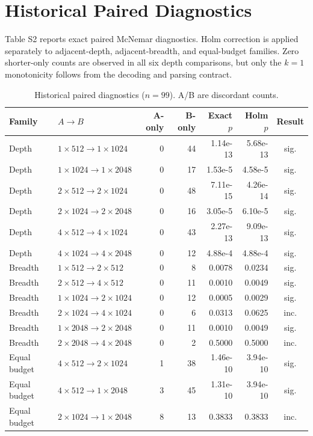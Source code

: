 \documentclass[runningheads]{llncs}
\begin{document}
\section{Historical Paired Diagnostics}

Table S2 reports exact paired McNemar diagnostics. Holm correction is applied
separately to adjacent-depth, adjacent-breadth, and equal-budget families.
Zero shorter-only counts are observed in all six depth comparisons, but only
the $k=1$ monotonicity follows from the decoding and parsing contract.

\begin{table}[!ht]
\caption{Historical paired diagnostics ($n=99$). A/B are discordant counts.}
\centering
\footnotesize
\begin{tabular}{llrrrrc}
\toprule
Family & $A\rightarrow B$ & A-only & B-only & Exact $p$ & Holm $p$ & Result \\
\midrule
Depth & $1{\times}512\rightarrow1{\times}1024$ & 0 & 44 & 1.14e-13 & 5.68e-13 & sig. \\
Depth & $1{\times}1024\rightarrow1{\times}2048$ & 0 & 17 & 1.53e-5 & 4.58e-5 & sig. \\
Depth & $2{\times}512\rightarrow2{\times}1024$ & 0 & 48 & 7.11e-15 & 4.26e-14 & sig. \\
Depth & $2{\times}1024\rightarrow2{\times}2048$ & 0 & 16 & 3.05e-5 & 6.10e-5 & sig. \\
Depth & $4{\times}512\rightarrow4{\times}1024$ & 0 & 43 & 2.27e-13 & 9.09e-13 & sig. \\
Depth & $4{\times}1024\rightarrow4{\times}2048$ & 0 & 12 & 4.88e-4 & 4.88e-4 & sig. \\
\midrule
Breadth & $1{\times}512\rightarrow2{\times}512$ & 0 & 8 & 0.0078 & 0.0234 & sig. \\
Breadth & $2{\times}512\rightarrow4{\times}512$ & 0 & 11 & 0.0010 & 0.0049 & sig. \\
Breadth & $1{\times}1024\rightarrow2{\times}1024$ & 0 & 12 & 0.0005 & 0.0029 & sig. \\
Breadth & $2{\times}1024\rightarrow4{\times}1024$ & 0 & 6 & 0.0313 & 0.0625 & inc. \\
Breadth & $1{\times}2048\rightarrow2{\times}2048$ & 0 & 11 & 0.0010 & 0.0049 & sig. \\
Breadth & $2{\times}2048\rightarrow4{\times}2048$ & 0 & 2 & 0.5000 & 0.5000 & inc. \\
\midrule
Equal budget & $4{\times}512\rightarrow2{\times}1024$ & 1 & 38 & 1.46e-10 & 3.94e-10 & sig. \\
Equal budget & $4{\times}512\rightarrow1{\times}2048$ & 3 & 45 & 1.31e-10 & 3.94e-10 & sig. \\
Equal budget & $2{\times}1024\rightarrow1{\times}2048$ & 8 & 13 & 0.3833 & 0.3833 & inc. \\
\bottomrule
\end{tabular}
\end{table}
\end{document}
